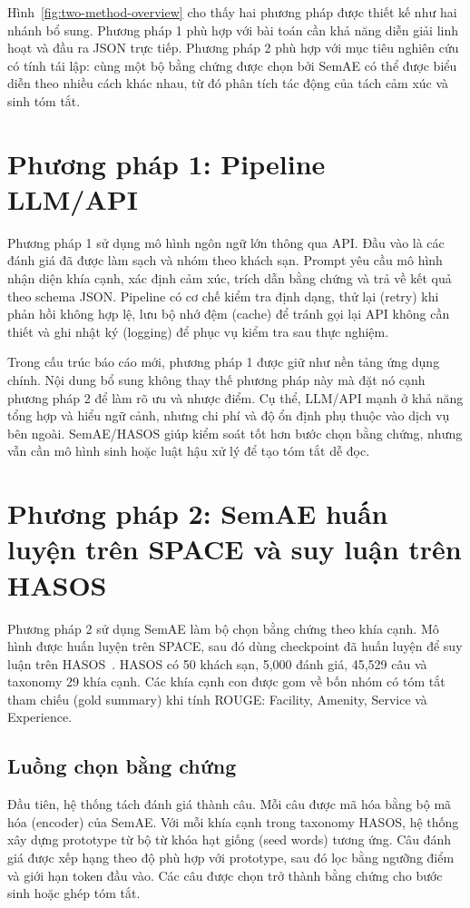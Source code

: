 \documentclass[12pt,a4paper]{report}
\begin{document}
Hình~\ref{fig:two-method-overview} cho thấy hai phương pháp được thiết kế như hai nhánh bổ sung. Phương pháp 1 phù hợp với bài toán cần khả năng diễn giải linh hoạt và đầu ra JSON trực tiếp. Phương pháp 2 phù hợp với mục tiêu nghiên cứu có tính tái lập: cùng một bộ bằng chứng được chọn bởi SemAE có thể được biểu diễn theo nhiều cách khác nhau, từ đó phân tích tác động của tách cảm xúc và sinh tóm tắt.

\section{Phương pháp 1: Pipeline LLM/API}

Phương pháp 1 sử dụng mô hình ngôn ngữ lớn thông qua API. Đầu vào là các đánh giá đã được làm sạch và nhóm theo khách sạn. Prompt yêu cầu mô hình nhận diện khía cạnh, xác định cảm xúc, trích dẫn bằng chứng và trả về kết quả theo schema JSON. Pipeline có cơ chế kiểm tra định dạng, thử lại (retry) khi phản hồi không hợp lệ, lưu bộ nhớ đệm (cache) để tránh gọi lại API không cần thiết và ghi nhật ký (logging) để phục vụ kiểm tra sau thực nghiệm.

Trong cấu trúc báo cáo mới, phương pháp 1 được giữ như nền tảng ứng dụng chính. Nội dung bổ sung không thay thế phương pháp này mà đặt nó cạnh phương pháp 2 để làm rõ ưu và nhược điểm. Cụ thể, LLM/API mạnh ở khả năng tổng hợp và hiểu ngữ cảnh, nhưng chi phí và độ ổn định phụ thuộc vào dịch vụ bên ngoài. SemAE/HASOS giúp kiểm soát tốt hơn bước chọn bằng chứng, nhưng vẫn cần mô hình sinh hoặc luật hậu xử lý để tạo tóm tắt dễ đọc.

\section{Phương pháp 2: SemAE huấn luyện trên SPACE và suy luận trên HASOS}

Phương pháp 2 sử dụng SemAE làm bộ chọn bằng chứng theo khía cạnh. Mô hình được huấn luyện trên SPACE, sau đó dùng checkpoint đã huấn luyện để suy luận trên HASOS~\cite{hasos}. HASOS có 50 khách sạn, 5,000 đánh giá, 45,529 câu và taxonomy 29 khía cạnh. Các khía cạnh con được gom về bốn nhóm có tóm tắt tham chiếu (gold summary) khi tính ROUGE: Facility, Amenity, Service và Experience.

\subsection{Luồng chọn bằng chứng}

Đầu tiên, hệ thống tách đánh giá thành câu. Mỗi câu được mã hóa bằng bộ mã hóa (encoder) của SemAE. Với mỗi khía cạnh trong taxonomy HASOS, hệ thống xây dựng prototype từ bộ từ khóa hạt giống (seed words) tương ứng. Câu đánh giá được xếp hạng theo độ phù hợp với prototype, sau đó lọc bằng ngưỡng điểm và giới hạn token đầu vào. Các câu được chọn trở thành bằng chứng cho bước sinh hoặc ghép tóm tắt.
\end{document}
